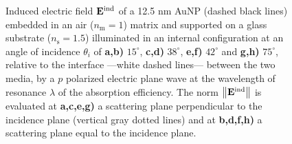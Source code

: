  \begin{figure}[h!]\centering
    \def\svgwidth{.7\textwidth}
    \scriptsize
    \\[-62.20em]
    \hspace*{-.255\textwidth}
        \begin{subfigure}{.25\textwidth}\textcolor{red}{\caption{ } \label{sfig:Near:SuppObl:p:15:perp}}\end{subfigure}%
        \begin{subfigure}{.3\textwidth}\caption{ }\label{sfig:Near:SuppObl:p:15:par}\end{subfigure}\\[12.7em]
    \hspace*{-.225\textwidth}
        \begin{subfigure}{.225\textwidth}\textcolor{red}{\caption{ } \label{sfig:Near:SuppObl:p:38:perp}}\end{subfigure}%
        \begin{subfigure}{.34\textwidth}\caption{ }\label{sfig:Near:SuppObl:p:38:par}\end{subfigure}\\[12.7em]
    \hspace*{-.225\textwidth}
        \begin{subfigure}{.225\textwidth}\textcolor{red}{\caption{ } \label{sfig:Near:SuppObl:p:42:perp}}\end{subfigure}%
        \begin{subfigure}{.34\textwidth}\caption{ }\label{sfig:Near:SuppObl:p:42:par}\end{subfigure}\\[12.7em]
    \hspace*{-.225\textwidth}
        \begin{subfigure}{.225\textwidth}\textcolor{red}{\caption{ } \label{sfig:Near:SuppObl:p:75:perp}}\end{subfigure}%
        \begin{subfigure}{.34\textwidth}\caption{ }\label{sfig:Near:SuppObl:p:75:par}\end{subfigure}\\[15.75em]
    \caption[Induced Electric Field of a 12.5 nm Au NP on substrate illuminated at oblique incidence with a $p$ polarized electric field]{\footnotesize Induced electric field $\vb{E}^\text{ind}$ of a 12.5 nm AuNP (dashed black lines) embedded in an air  ($n_\text{m} = 1$)  matrix and supported on a glass substrate ($n_\text{s} = 1.5$) illuminated in an internal configuration at an angle of incidence $\theta_i$ of \textbf{a,b)} $15^\circ$, \textbf{c,d)} $38^\circ$, \textbf{e,f)} $42^\circ$ and  \textbf{g,h)} $75^\circ$, relative to the interface ---white dashed lines--- between the two media, by a $p$ polarized electric plane wave at  the wavelength of resonance $\lambda$ of the absorption efficiency.  The norm $\norm{\vb{E}^\text{ind}}$ is evaluated at  \textbf{a,c,e,g)} a scattering plane perpendicular to the incidence plane (vertical gray dotted lines) and at \textbf{b,d,f,h)} a scattering plane equal to the incidence plane.    }
    \label{fig:Near:SuppObl:p}
  \end{figure}
